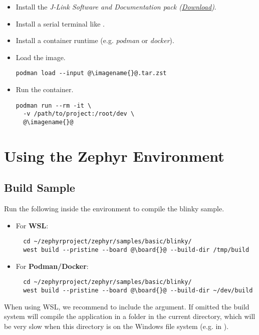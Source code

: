 \begin{itemize}
  \item Install the \emph{J-Link Software and Documentation pack (\href{https://www.segger.com/downloads/jlink}{Download})}.
  \item Install a serial terminal like .
  \item Install a container runtime (e.g. \emph{podman} or \emph{docker}).
  \item Load the image.
        \begin{lstlisting}
podman load --input @\imagename{}@.tar.zst
\end{lstlisting}
  \item Run the container.
        \begin{lstlisting}
podman run --rm -it \
  -v /path/to/project:/root/dev \
  @\imagename{}@
\end{lstlisting}
\end{itemize}

\newpage

\section{Using the Zephyr Environment}

\subsection{Build Sample}

Run the following inside the environment to compile the blinky sample.

\begin{itemize}
  \item For \textbf{WSL}:
  \begin{lstlisting}
  cd ~/zephyrproject/zephyr/samples/basic/blinky/
  west build --pristine --board @\board{}@ --build-dir /tmp/build
  \end{lstlisting}
  \item For \textbf{Podman/Docker}:
  \begin{lstlisting}
  cd ~/zephyrproject/zephyr/samples/basic/blinky/
  west build --pristine --board @\board{}@ --build-dir ~/dev/build
  \end{lstlisting}
\end{itemize}

\begin{infobox}
  When using WSL, we recommend to include the  argument.
  If omitted the build system will compile the application in a  folder in the current directory, which will be very slow when this directory is on the Windows file system (e.g. in ).
\end{infobox}

